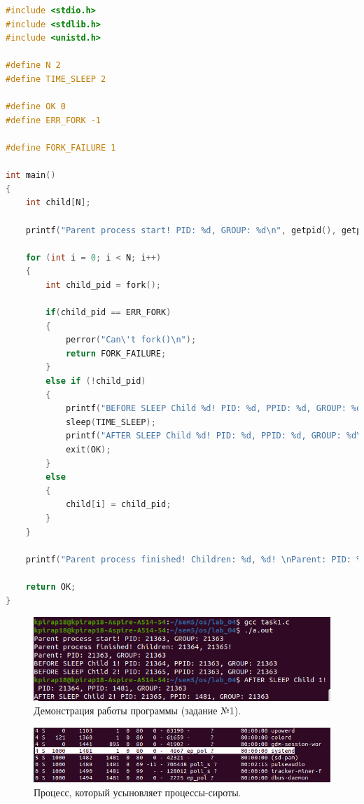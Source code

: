 \documentclass[12pt]{report}
\begin{document}
\begin{lstlisting}[label=some-code,caption=Процессы-сироты,language=C]
#include <stdio.h>
#include <stdlib.h>
#include <unistd.h>

#define N 2
#define TIME_SLEEP 2

#define OK 0
#define ERR_FORK -1

#define FORK_FAILURE 1

int main()
{
	int child[N];
	
	printf("Parent process start! PID: %d, GROUP: %d\n", getpid(), getpgrp());
	
	for (int i = 0; i < N; i++)
	{
		int child_pid = fork();
		
		if(child_pid == ERR_FORK)
		{
			perror("Can\'t fork()\n");
			return FORK_FAILURE;
		}
		else if (!child_pid)
		{
            printf("BEFORE SLEEP Child %d! PID: %d, PPID: %d, GROUP: %d \n", i + 1, getpid(), getppid(), getpgrp());
			sleep(TIME_SLEEP);
            printf("AFTER SLEEP Child %d! PID: %d, PPID: %d, GROUP: %d\n", i + 1, getpid(), getppid(), getpgrp());
			exit(OK);
		}
		else
		{
			child[i] = child_pid;
		}
	}
	
	printf("Parent process finished! Children: %d, %d! \nParent: PID: %d, GROUP: %d\n ", child[0], child[1], getpid(), getpgrp());
	
	return OK;
}
\end{lstlisting}

\begin{figure}[H]

	\centering

	\includegraphics[width=\linewidth]{img/p1.png}
	\caption{Демонстрация работы программы (задание №1).}

	\label{fig:p1}

\end{figure}

\begin{figure}[H]
	
	\centering
	
	\includegraphics[width=\linewidth]{img/p1_2.png}
	\caption{Процесс, который усыновляет процессы-сироты.}
	
	\label{fig:p1_2}
	
\end{figure}
\end{document}
